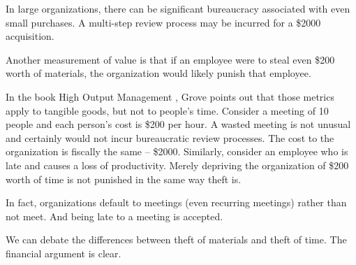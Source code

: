 In large organizations, there can be significant bureaucracy associated with even small purchases. A multi-step review process may be incurred for a \$2000 acquisition.

Another measurement of value is that if an employee were to steal even \$200 worth of materials, the organization would likely punish that employee.


In the book High Output Management \cite{1995_Grove}, Grove points out that those metrics apply to tangible goods, but not to people's time. Consider a meeting of 10 people and each person's cost is \$200 per hour. A wasted meeting is not unusual and certainly would not incur bureaucratic review processes. The cost to the organization is fiscally the same -- \$2000. Similarly, consider an employee who is late and causes a loss of productivity. Merely depriving the organization of \$200 worth of time is not punished in the same way theft is.

In fact, organizations default to meetings (even recurring meetings) rather than not meet. And being late to a meeting is accepted. 

We can debate the differences between theft of materials and theft of time. The financial argument is clear. 

